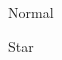 \documentclass{article}
\begin{document}
\listoffigures
\begin{figure}[h]\caption{Normal}\end{figure}
\begin{figure}[h]\caption*{Star}\end{figure}
\end{document}
